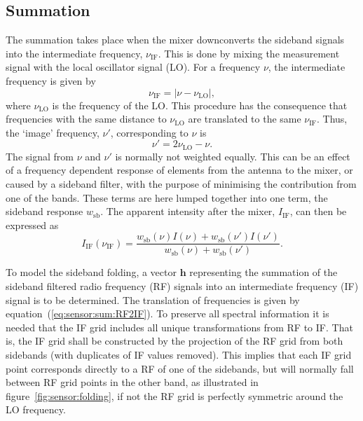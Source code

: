 \subsection{Summation}
\label{sec:sensor:sum}
The summation takes place when the mixer downconverts the sideband signals into the intermediate frequency, $\nu_\mathrm{IF}$. This is done by mixing the measurement signal with the local oscillator signal (LO).
For a frequency $\nu$, the intermediate frequency is given by
\begin{equation}
  \label{eq:sensor:sum:v_if} 
  \nu_\mathrm{IF} = \vert \nu - \nu_\mathrm{LO} \vert,
\end{equation}
where $\nu_\mathrm{LO}$ is the frequency of the LO. This procedure has the consequence that frequencies with the same distance to $\nu_\mathrm{LO}$ are translated to the same $\nu_\mathrm{IF}$. Thus, the `image'
frequency, $\nu'$, corresponding to $\nu$ is
\begin{equation}
  \label{eq:sensor:sum:RF2IF}
  \nu' = 2\nu_\mathrm{LO} - \nu.
\end{equation}
The signal from $\nu$ and $\nu'$ is normally not weighted equally.
This can be an effect of a frequency dependent response of elements from
the antenna to the mixer, or caused by a sideband filter, with the
purpose of minimising the contribution from one of the bands. These
terms are here lumped together into one term, the sideband response
$w_\mathrm{sb}$. The apparent intensity after the mixer,
$I_\mathrm{IF}$, can then be expressed as
\begin{equation}
  \label{eq:sensor:sum:I_IF} 
  I_\mathrm{IF}(\nu_\mathrm{IF}) = \frac{w_\mathrm{sb}(\nu)I(\nu) + 
    w_\mathrm{sb}(\nu')I(\nu')}{w_\mathrm{sb}(\nu) + w_\mathrm{sb}(\nu')}.
\end{equation} 

To model the sideband folding, a vector $\mathbf{h}$ representing
the summation of the sideband filtered radio frequency (RF) signals
into an intermediate frequency (IF) signal is to be determined. The
translation of frequencies is given by equation~(\ref{eq:sensor:sum:RF2IF}). To
preserve all spectral information it is needed that the IF grid
includes all unique transformations from RF to IF. That is, the IF
grid shall be constructed by the projection of the RF grid from both
sidebands (with duplicates of IF values removed). This implies that
each IF grid point corresponds directly to a RF of one of the
sidebands, but will normally fall between RF grid points in the
other band, as illustrated in figure~\ref{fig:sensor:folding}, 
if not the RF grid is perfectly symmetric around the LO frequency.

